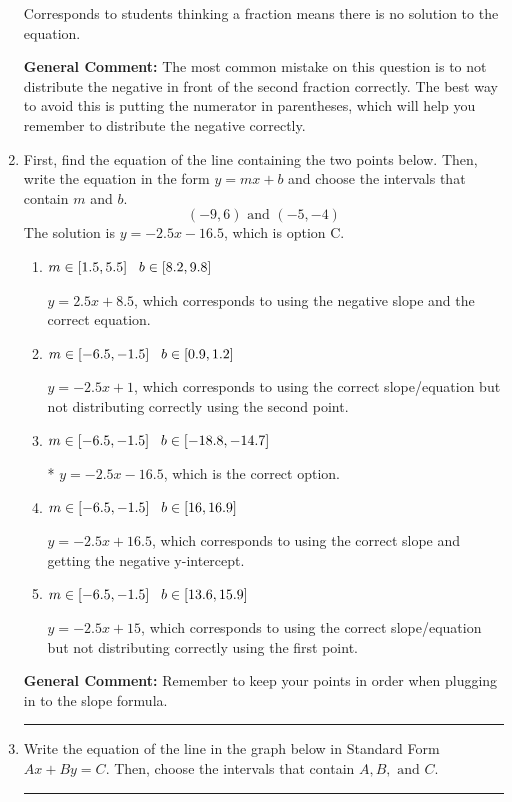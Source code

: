 \documentclass{extbook}[14pt]
\newcommand{\litem}[1]{\item #1

\rule{\textwidth}{0.4pt}}
\begin{document}
\begin{enumerate}
{\begin{enumerate}[label=\Alph*.]
Corresponds to students thinking a fraction means there is no solution to the equation.
\end{enumerate}

\textbf{General Comment:} The most common mistake on this question is to not distribute the negative in front of the second fraction correctly. The best way to avoid this is putting the numerator in parentheses, which will help you remember to distribute the negative correctly.
}
\litem{
First, find the equation of the line containing the two points below. Then, write the equation in the form $ y=mx+b $ and choose the intervals that contain $m$ and $b$.
\[ (-9, 6) \text{ and } (-5, -4) \]The solution is \( y = -2.5x -16.5 \), which is option C.\begin{enumerate}[label=\Alph*.]
\item \( m \in [1.5, 5.5] \hspace*{3mm} b \in [8.2, 9.8] \)

 $y = 2.5x + 8.5$, which corresponds to using the negative slope and the correct equation.
\item \( m \in [-6.5, -1.5] \hspace*{3mm} b \in [0.9, 1.2] \)

 $y = -2.5x + 1$, which corresponds to using the correct slope/equation but not distributing correctly using the second point.
\item \( m \in [-6.5, -1.5] \hspace*{3mm} b \in [-18.8, -14.7] \)

* $y = -2.5x -16.5$, which is the correct option.
\item \( m \in [-6.5, -1.5] \hspace*{3mm} b \in [16, 16.9] \)

 $y = -2.5x + 16.5$, which corresponds to using the correct slope and getting the negative y-intercept.
\item \( m \in [-6.5, -1.5] \hspace*{3mm} b \in [13.6, 15.9] \)

 $y = -2.5x + 15$, which corresponds to using the correct slope/equation but not distributing correctly using the first point.
\end{enumerate}

\textbf{General Comment:} Remember to keep your points in order when plugging in to the slope formula.
}
\litem{
Write the equation of the line in the graph below in Standard Form $Ax+By=C$. Then, choose the intervals that contain $A, B, \text{ and } C$.

}
\end{enumerate}
\end{document}
